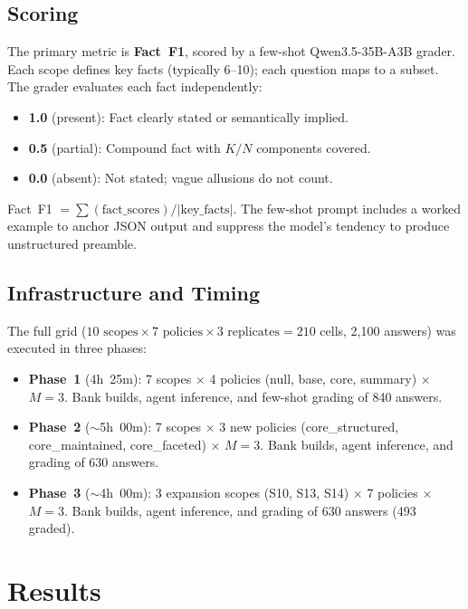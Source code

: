\documentclass[11pt,a4paper]{article}
\begin{document}
\subsection{Scoring}

The primary metric is \textbf{Fact~F1}, scored by a few-shot Qwen3.5-35B-A3B grader. Each scope defines key facts (typically 6--10); each question maps to a subset. The grader evaluates each fact independently:

\begin{itemize}[nosep]
    \item \textbf{1.0} (present): Fact clearly stated or semantically implied.
    \item \textbf{0.5} (partial): Compound fact with $K/N$ components covered.
    \item \textbf{0.0} (absent): Not stated; vague allusions do not count.
\end{itemize}

Fact~F1 $= \sum(\text{fact\_scores}) / |\text{key\_facts}|$. The few-shot prompt includes a worked example to anchor JSON output and suppress the model's tendency to produce unstructured preamble.

\subsection{Infrastructure and Timing}

The full grid ($10 \text{ scopes} \times 7 \text{ policies} \times 3 \text{ replicates} = 210$ cells, 2,100 answers) was executed in three phases:

\begin{itemize}[nosep]
    \item \textbf{Phase~1} (4h~25m): 7 scopes $\times$ 4 policies (null, base, core, summary) $\times$ $M{=}3$. Bank builds, agent inference, and few-shot grading of 840 answers.
    \item \textbf{Phase~2} (${\sim}$5h~00m): 7 scopes $\times$ 3 new policies (core\_structured, core\_maintained, core\_faceted) $\times$ $M{=}3$. Bank builds, agent inference, and grading of 630 answers.
    \item \textbf{Phase~3} (${\sim}$4h~00m): 3 expansion scopes (S10, S13, S14) $\times$ 7 policies $\times$ $M{=}3$. Bank builds, agent inference, and grading of 630 answers (493 graded).
\end{itemize}

\section{Results}
\end{document}
